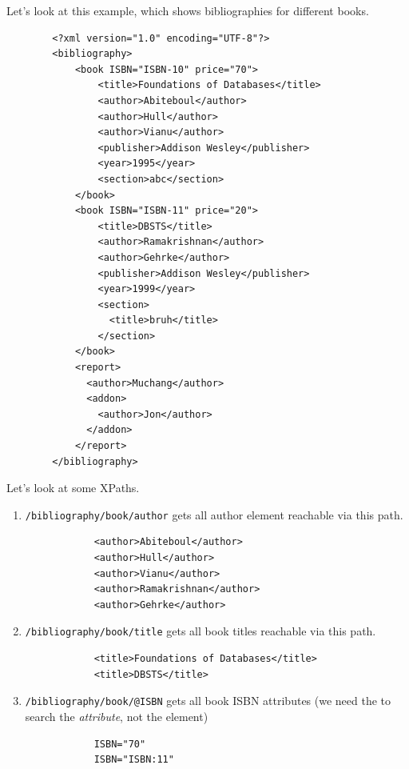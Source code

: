 \documentclass{article}
\begin{document}
    \begin{example}
      Let's look at this example, which shows bibliographies for different books. 
      \begin{lstlisting}
        <?xml version="1.0" encoding="UTF-8"?>
        <bibliography>
            <book ISBN="ISBN-10" price="70">
                <title>Foundations of Databases</title>
                <author>Abiteboul</author>
                <author>Hull</author>
                <author>Vianu</author>
                <publisher>Addison Wesley</publisher>
                <year>1995</year>
                <section>abc</section>
            </book>
            <book ISBN="ISBN-11" price="20">
                <title>DBSTS</title>
                <author>Ramakrishnan</author>
                <author>Gehrke</author>
                <publisher>Addison Wesley</publisher>
                <year>1999</year>
                <section>
                  <title>bruh</title>
                </section>
            </book>
            <report>
              <author>Muchang</author>
              <addon>
                <author>Jon</author>
              </addon>
            </report>
        </bibliography> 
      \end{lstlisting}
      Let's look at some XPaths. 
      \begin{enumerate}
        \item \texttt{/bibliography/book/author} gets all author element reachable via this path.
          \begin{lstlisting}
            <author>Abiteboul</author>
            <author>Hull</author>
            <author>Vianu</author>
            <author>Ramakrishnan</author>
            <author>Gehrke</author>
          \end{lstlisting}

        \item \texttt{/bibliography/book/title} gets all book titles reachable via this path. 
          \begin{lstlisting}
            <title>Foundations of Databases</title>
            <title>DBSTS</title>
          \end{lstlisting}

        \item \texttt{/bibliography/book/@ISBN} gets all book ISBN attributes (we need the \texttt{\@} to search the \textit{attribute}, not the element)
          \begin{lstlisting}
            ISBN="70"
            ISBN="ISBN:11"
          \end{lstlisting}


\end{enumerate}
\end{example}
\end{document}
